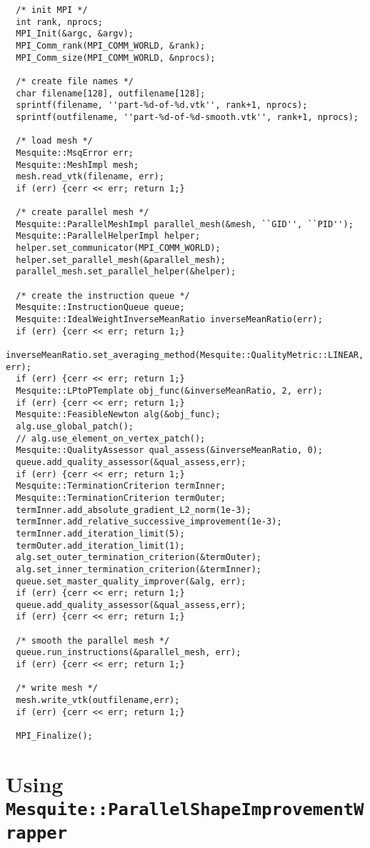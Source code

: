 \begin{verbatim}
  /* init MPI */
  int rank, nprocs;
  MPI_Init(&argc, &argv);
  MPI_Comm_rank(MPI_COMM_WORLD, &rank);
  MPI_Comm_size(MPI_COMM_WORLD, &nprocs);

  /* create file names */
  char filename[128], outfilename[128];
  sprintf(filename, ''part-%d-of-%d.vtk'', rank+1, nprocs);
  sprintf(outfilename, ''part-%d-of-%d-smooth.vtk'', rank+1, nprocs);

  /* load mesh */
  Mesquite::MsqError err;
  Mesquite::MeshImpl mesh;
  mesh.read_vtk(filename, err);
  if (err) {cerr << err; return 1;}

  /* create parallel mesh */
  Mesquite::ParallelMeshImpl parallel_mesh(&mesh, ``GID'', ``PID'');
  Mesquite::ParallelHelperImpl helper;
  helper.set_communicator(MPI_COMM_WORLD);
  helper.set_parallel_mesh(&parallel_mesh);
  parallel_mesh.set_parallel_helper(&helper);

  /* create the instruction queue */
  Mesquite::InstructionQueue queue;
  Mesquite::IdealWeightInverseMeanRatio inverseMeanRatio(err);
  if (err) {cerr << err; return 1;}
  inverseMeanRatio.set_averaging_method(Mesquite::QualityMetric::LINEAR, err);
  if (err) {cerr << err; return 1;}
  Mesquite::LPtoPTemplate obj_func(&inverseMeanRatio, 2, err);
  if (err) {cerr << err; return 1;}
  Mesquite::FeasibleNewton alg(&obj_func);
  alg.use_global_patch();
  // alg.use_element_on_vertex_patch();
  Mesquite::QualityAssessor qual_assess(&inverseMeanRatio, 0);
  queue.add_quality_assessor(&qual_assess,err);
  if (err) {cerr << err; return 1;}
  Mesquite::TerminationCriterion termInner;
  Mesquite::TerminationCriterion termOuter;
  termInner.add_absolute_gradient_L2_norm(1e-3);
  termInner.add_relative_successive_improvement(1e-3);
  termInner.add_iteration_limit(5);
  termOuter.add_iteration_limit(1);
  alg.set_outer_termination_criterion(&termOuter);
  alg.set_inner_termination_criterion(&termInner);
  queue.set_master_quality_improver(&alg, err);
  if (err) {cerr << err; return 1;}
  queue.add_quality_assessor(&qual_assess,err);
  if (err) {cerr << err; return 1;}

  /* smooth the parallel mesh */
  queue.run_instructions(&parallel_mesh, err);
  if (err) {cerr << err; return 1;}

  /* write mesh */
  mesh.write_vtk(outfilename,err);
  if (err) {cerr << err; return 1;}

  MPI_Finalize();
\end{verbatim}

\section{Using \texttt{Mesquite::ParallelShapeImprovementWrapper}}

